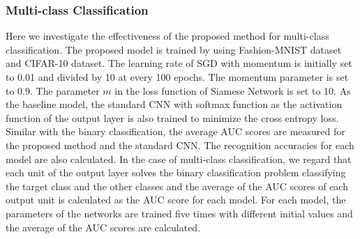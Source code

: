 \documentclass[a4paper,12pt]{article}
\begin{document}
\subsubsection{Multi-class Classification}
Here we investigate the effectiveness of the proposed method for multi-class classification.
The proposed model is trained by using Fashion-MNIST dataset and CIFAR-10 dataset.
The learning rate of SGD with momentum is initially set to 0.01 and divided by 10 at every 100 epochs.  
The  momentum parameter is set to  0.9. 
The parameter $m$ in the loss function of Siamese Network is set to 10.
As the baseline model, the standard CNN with softmax function as the activation function of the output layer is also trained to minimize the cross entropy loss.
Similar with the binary classification, the average AUC scores are measured for the proposed method and the standard CNN.
The recognition accuracies for each model are also calculated.
In the case of multi-class classification, %
we regard that each unit of the output layer solves the binary classification problem classifying the target class and the other classes and the average of the AUC scores of each output unit is calculated as the AUC score for each model.
For each model, the parameters of the networks are trained five times with different initial values and the average of the AUC scores are calculated.
\end{document}
